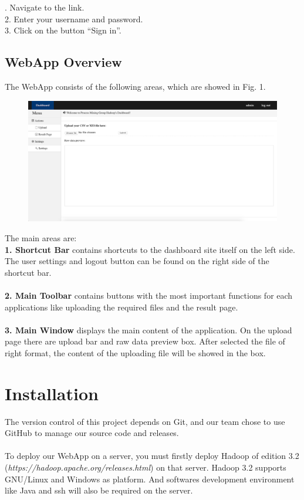 \documentclass[runningheads]{llncs}
\begin{document}
. Navigate to the link.\\
2. Enter your username and password.\\
3. Click on the button “Sign in”.\\

\subsection{WebApp Overview}
The WebApp consists of the following areas, which are showed in Fig. 1.\\

\begin{figure}[h]	
	\centering
	\includegraphics[scale=0.24]{dashboard.png}
	\caption{}
	\label{fig:label}
\end{figure}
\noindent
The main areas are:\\

\noindent
\textbf{1. Shortcut Bar} contains shortcuts to the dashboard site itself on the left side. The user settings and logout button can be found on the right side of the shortcut bar.\\\\
\noindent
\textbf{2. Main Toolbar} contains buttons with the most important functions for each applications like uploading the required files and the result page.\\\\
\noindent
\textbf{3. Main Window} displays the main content of the application. On the upload page there are upload bar and raw data preview box. After selected the file of right format, the content of the uploading file will be showed in the box.

\section{Installation}
The version control of this project depends on Git, and our team chose to use GitHub to manage our source code and releases.\\\\
\noindent
To deploy our WebApp on a server, you must firstly deploy Hadoop of edition 3.2 (\textit{https://hadoop.apache.org/releases.html}) on that server. Hadoop 3.2 supports GNU/Linux and Windows as platform. And softwares development environment like Java and ssh will also be required on the server.
\end{document}

